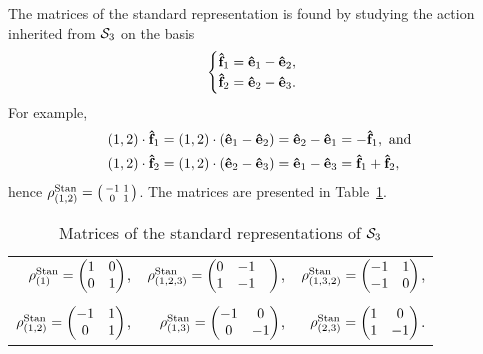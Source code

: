 \begin{example}\label{example:stdSym3}
	The matrices of the standard representation is found by studying the action inherited from $\mathcal{S}_3$ on the basis 
	\begin{align*}
		\begin{cases}
			\mathbf{\hat{f}}_1 = \mathbf{\hat{e}}_1-\mathbf{\hat{e}}_2, \\
			\mathbf{\hat{f}}_2 = \mathbf{\hat{e}}_2-\mathbf{\hat{e}}_3.
		\end{cases}
	\end{align*}
	For example, \begin{align*}
		(1,2)\cdot \mathbf{\hat{f}}_1 &= (1,2)\cdot (\mathbf{\hat{e}}_1-\mathbf{\hat{e}}_2) = \mathbf{\hat{e}}_2-\mathbf{\hat{e}}_1 = -\mathbf{\hat{f}}_1, \text{ and} \\
		(1,2)\cdot \mathbf{\hat{f}}_2 &= (1,2) \cdot (\mathbf{\hat{e}}_2-\mathbf{\hat{e}}_3) = \mathbf{\hat{e}}_1-\mathbf{\hat{e}}_3 = \mathbf{\hat{f}}_1 + \mathbf{\hat{f}}_2,
	\end{align*} hence $\rho^{\text{Stan}}_{(1,2)} = \left(\begin{smallmatrix}
		-1 & 1 \\ 0 & 1
	\end{smallmatrix}\right)$. The matrices are presented in Table~\ref{table:standardS3}.
	
	\begin{table}[hbt!]
		\centering
		\begin{tabular}{r r r}
			$\rho^{\text{Stan}}_{(1)} = 
			\begin{pmatrix}
				1 & 0 \\
				0 & 1
			\end{pmatrix}$, & 
			$\rho^{\text{Stan}}_{(1,2,3)} = 
			\begin{pmatrix}
				0 & -1 &\\
				1 & -1
			\end{pmatrix}$, & 
			$\rho^{\text{Stan}}_{(1,3,2)} = 
			\begin{pmatrix}
				-1 & 1  \\
				-1 & 0
			\end{pmatrix}$, \\ & & \\
			$\rho^{\text{Stan}}_{(1,2)} = 
			\begin{pmatrix}
				-1 & 1 \\
				0  & 1
			\end{pmatrix}$, &
			$\rho^{\text{Stan}}_{(1,3)} = 
			\begin{pmatrix}
				-1 & 0 \\
				0 & -1 
			\end{pmatrix}$, &
			$\rho^{\text{Stan}}_{(2,3)} = 
			\begin{pmatrix}
				1 & 0 \\
				1 & -1 
			\end{pmatrix}$.
		\end{tabular}
		\caption{Matrices of the standard representations of $\mathcal{S}_3$}
		\label{table:standardS3}
	\end{table}
\end{example}

